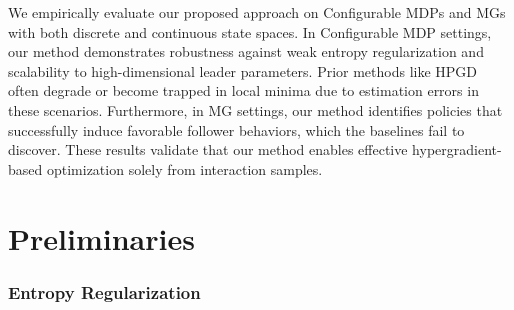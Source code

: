\documentclass[letterpaper]{article} %
\begin{document}
We empirically evaluate our proposed approach on Configurable MDPs and MGs with both discrete and continuous state spaces.
In Configurable MDP settings, our method demonstrates robustness against weak entropy regularization and scalability to high-dimensional leader parameters. 
Prior methods like HPGD often degrade or become trapped in local minima due to estimation errors in these scenarios.
Furthermore, in MG settings, our method identifies policies that successfully induce favorable follower behaviors, which the baselines fail to discover.
These results validate that our method enables effective hypergradient-based optimization solely from interaction samples.


\section{Preliminaries}

\subsubsection{Entropy Regularization}
\end{document}
